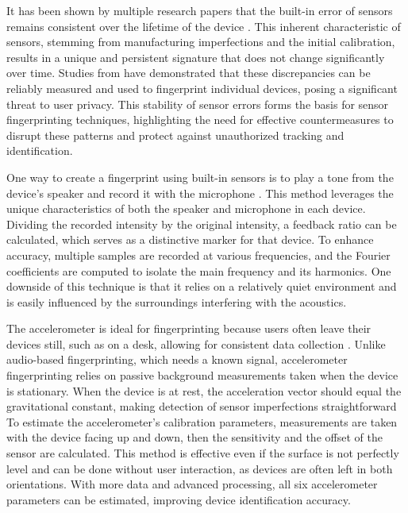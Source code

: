 \documentclass[11pt,
  oneside,openany,    %
]{scrreprt}
\begin{document}
It has been shown by multiple research papers that the built-in error of sensors remains consistent over the lifetime of the device \cite{DBLP:conf/sp/ZhangBS19, DBLP:conf/ndss/DeyRXCN14}. 
This inherent characteristic of sensors, stemming from manufacturing imperfections and the initial calibration, results in a unique and persistent signature that does not change significantly over time. 
Studies from \citeauthor{DBLP:journals/popets/DasBC18} \cite{DBLP:journals/popets/DasBC18, DBLP:conf/ndss/DasBC16, DBLP:conf/ccs/DasBC14, DBLP:conf/ccs/0001ABP18} have demonstrated that these discrepancies can be reliably measured and used to fingerprint individual devices, posing a significant threat to user privacy. 
This stability of sensor errors forms the basis for sensor fingerprinting techniques, highlighting the need for effective countermeasures to disrupt these patterns and protect against unauthorized tracking and identification.

One way to create a fingerprint using built-in sensors is to play a tone from the device's speaker and record it with the microphone \cite{DBLP:conf/ccs/DasBC14, DBLP:journals/comsur/BaldiniS17}.
This method leverages the unique characteristics of both the speaker and microphone in each device.
Dividing the recorded intensity by the original intensity, a feedback ratio can be calculated, which serves as a distinctive marker for that device.
To enhance accuracy, multiple samples are recorded at various frequencies, and the Fourier coefficients are computed to isolate the main frequency and its harmonics.
One downside of this technique is that it relies on a relatively quiet environment and is easily influenced by the surroundings interfering with the acoustics.

The accelerometer is ideal for fingerprinting because users often leave their devices still, such as on a desk, allowing for consistent data collection \cite{DBLP:conf/ndss/DeyRXCN14, DBLP:conf/sp/ZhangBS19, DBLP:journals/comsur/BaldiniS17}.
Unlike audio-based fingerprinting, which needs a known signal, accelerometer fingerprinting relies on passive background measurements taken when the device is stationary.
When the device is at rest, the acceleration vector should equal the gravitational constant, making detection of sensor imperfections straightforward
To estimate the accelerometer's calibration parameters, measurements are taken with the device facing up and down, then the sensitivity and the offset of the sensor are calculated.
This method is effective even if the surface is not perfectly level and can be done without user interaction, as devices are often left in both orientations.
With more data and advanced processing, all six accelerometer parameters can be estimated, improving device identification accuracy.
\end{document}

